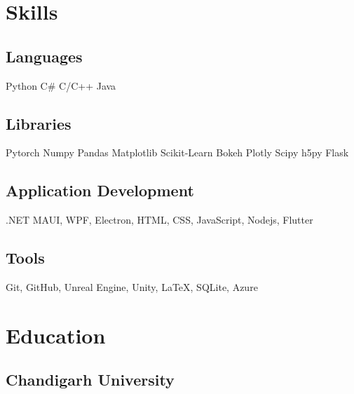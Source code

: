 \documentclass[]{absolute}
\begin{document}
\begin{minipage}[t]{0.65\textwidth}
%
%

\end{minipage} 
\hfill
\begin{minipage}[t]{0.3\textwidth} 


\section{Skills}
\subsection{Languages}
\sectionsep
Python \textbullet{} C\# \textbullet{} C/C++ \textbullet{} Java \\
\sectionsep
\subsection{Libraries}
\sectionsep
Pytorch \textbullet{} Numpy \textbullet{} Pandas \textbullet{} Matplotlib \textbullet{} Scikit-Learn \textbullet{} Bokeh \textbullet{} Plotly \textbullet{} Scipy \textbullet{} h5py \textbullet{} Flask
\sectionsep
\subsection{Application Development}
\sectionsep
.NET MAUI, WPF, Electron, HTML, CSS, JavaScript, Nodejs, Flutter
\sectionsep
\subsection{Tools}
\sectionsep
Git, GitHub, Unreal Engine, Unity, \LaTeX, SQLite, Azure
\sectionsep


\section{Education} 

\sectionsep
\subsection{Chandigarh University}
\sectionsep



\end{minipage}
\end{document}
